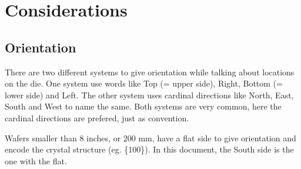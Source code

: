 \section{Considerations}

\subsection{Orientation}

There are two different systems to give orientation while talking about locations on the die.
One system use words like Top (= upper side), Right, Bottom (= lower side) and Left.
The other system uses cardinal directions like North, East, South and West to name the same.
Both systems are very common, here the cardinal directions are prefered, just as convention.



Wafers smaller than 8 inches, or 200 mm, have a flat side to give orientation and encode the crystal structure (eg. \{100\}).
In this document, the South side is the one with the flat.

